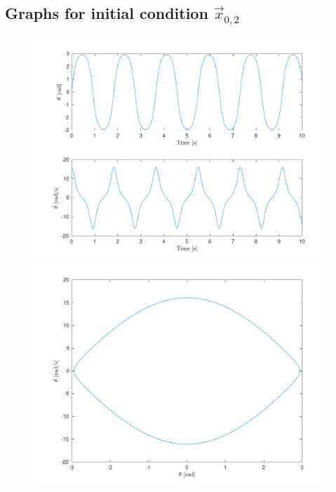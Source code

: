 \documentclass[10pt]{article}
\begin{document}
\subsection{Graphs for initial condition $\vec{x}_{0,2}$}
\begin{figure}[ht]
    \centering
    \begin{minipage}[b]{0.45\textwidth}
        \centering
        \includegraphics[width=1\linewidth]{lab1/figs/section3_x0_2_state_evolution.pdf}
    \end{minipage}
    \begin{minipage}[b]{0.45\textwidth}
        \centering
        \includegraphics[width=1\linewidth]{lab1/figs/section3_x0_2_state_orbit.pdf}
    \end{minipage}
    
    \label{figure:x_0_2_state_evolution}
\end{figure}
\end{document}
